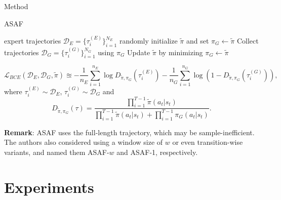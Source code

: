 \documentclass[10pt,aspectratio=169]{beamer}
\begin{document}
\begin{frame}{Method}
	\begin{algorithm}[H]
		\caption{ASAF}
		\label{algo:asaf}
		\begin{algorithmic}
			\REQUIRE expert trajectories $\mathcal{D}_E = \{\tau_i^{(E)}\}_{i=1}^{N_E}$
			\STATE randomly initialize $\tilde{\pi}$ and set $\pi_G \gets \tilde{\pi}$
			\STATE Collect trajectories $\mathcal{D}_G = \{\tau_i^{(G)}\}^{N_G}_{i=1}$ using $\pi_G$
			\STATE Update $\tilde{\pi}$ by minimizing 
			\STATE $\pi_G \gets \tilde{\pi}$
			\ENDFOR
		\end{algorithmic}
	\end{algorithm}

	\begin{equation}\label{equ:2}
		\mathcal{L}_{BCE}(\mathcal{D}_E,\mathcal{D}_G, \tilde{\pi}) \approxeq -\frac{1}{n_E}\sum_{i=1}^{n_E}\log D_{\tilde{\pi}, \pi_G}(\tau_i^{(E)})-\frac{1}{n_G}\sum_{i=1}^{n_G}\log\left(1- D_{\tilde{\pi}, \pi_G}(\tau_i^{(G)})\right),
	\end{equation}
	where $\tau_i^{(E)} \sim \mathcal{D}_E$, $\tau_i^{(G)} \sim \mathcal{D}_G$ and
	\begin{equation}\label{equ:emp_d}
		D_{\tilde{\pi}, \pi_G}(\tau) = \frac{\prod_{i=1}^{T-1}\tilde{\pi}(a_t|s_t)}{\prod_{i=1}^{T-1}\tilde{\pi}(a_t|s_t) + \prod_{i=1}^{T-1}\pi_G(a_t|s_t)}.
	\end{equation}

    {\bf Remark}: ASAF uses the full-length trajectory, which may be sample-inefficient. The authors also considered using a window size of $w$ or even transition-wise variants, and named them ASAF-$w$ and ASAF-1, respectively.
\end{frame}

\section{Experiments}
\end{document}
